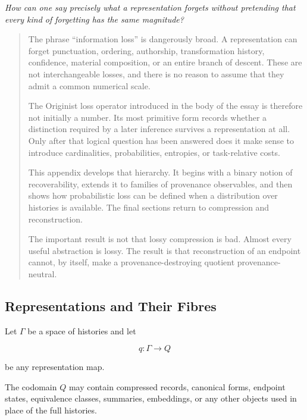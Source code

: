 \documentclass[
  11pt,
  a4paper,
  DIV=12,
  BCOR=0mm,
  parskip=half-
]{scrartcl}
\theoremstyle{definition}
\theoremstyle{plain}
\theoremstyle{remark}
\newcommand{\movementquestion}[1]{%
  \begin{center}
    \small\itshape
    #1
  \end{center}
  \medskip
}
\newenvironment{orientation}
  {%
    \begin{quote}
    \small
    \setlength{\parindent}{1em}
  }
  {%
    \end{quote}
  }
\begin{document}
\movementquestion{How can one say precisely what a representation forgets without pretending that every kind of forgetting has the same magnitude?}

\begin{orientation}
The phrase \enquote{information loss} is dangerously broad. A representation
can forget punctuation, ordering, authorship, transformation history,
confidence, material composition, or an entire branch of descent. These are
not interchangeable losses, and there is no reason to assume that they admit
a common numerical scale.

The Originist loss operator introduced in the body of the essay is therefore
not initially a number. Its most primitive form records whether a distinction
required by a later inference survives a representation at all. Only after
that logical question has been answered does it make sense to introduce
cardinalities, probabilities, entropies, or task-relative costs.

This appendix develops that hierarchy. It begins with a binary notion of
recoverability, extends it to families of provenance observables, and then
shows how probabilistic loss can be defined when a distribution over histories
is available. The final sections return to compression and reconstruction.

The important result is not that lossy compression is bad. Almost every useful
abstraction is lossy. The result is that reconstruction of an endpoint cannot,
by itself, make a provenance-destroying quotient provenance-neutral.
\end{orientation}


\subsection{Representations and Their Fibres}
\label{app:representation-fibres}

Let \(\Gamma\) be a space of histories and let

\[
  q:\Gamma\to Q
\]

be any representation map.

The codomain \(Q\) may contain compressed records, canonical forms, endpoint
states, equivalence classes, summaries, embeddings, or any other objects used
in place of the full histories.
\end{document}
